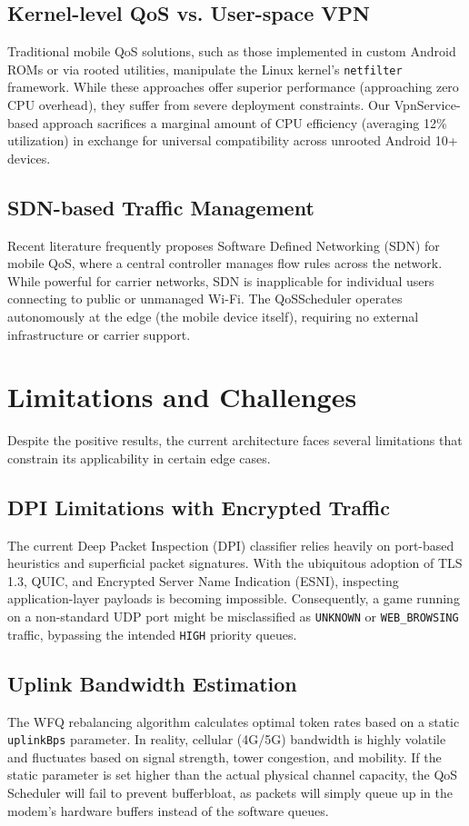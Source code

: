 \subsection{Kernel-level QoS vs. User-space VPN}
Traditional mobile QoS solutions, such as those implemented in custom Android ROMs or via rooted utilities, manipulate the Linux kernel's \texttt{netfilter} framework. While these approaches offer superior performance (approaching zero CPU overhead), they suffer from severe deployment constraints. Our VpnService-based approach sacrifices a marginal amount of CPU efficiency (averaging 12\% utilization) in exchange for universal compatibility across unrooted Android 10+ devices.

\subsection{SDN-based Traffic Management}
Recent literature frequently proposes Software Defined Networking (SDN) for mobile QoS, where a central controller manages flow rules across the network. While powerful for carrier networks, SDN is inapplicable for individual users connecting to public or unmanaged Wi-Fi. The QoSScheduler operates autonomously at the edge (the mobile device itself), requiring no external infrastructure or carrier support.

\section{Limitations and Challenges}
\label{sec:limitations}

Despite the positive results, the current architecture faces several limitations that constrain its applicability in certain edge cases.

\subsection{DPI Limitations with Encrypted Traffic}
The current Deep Packet Inspection (DPI) classifier relies heavily on port-based heuristics and superficial packet signatures. With the ubiquitous adoption of TLS 1.3, QUIC, and Encrypted Server Name Indication (ESNI), inspecting application-layer payloads is becoming impossible. Consequently, a game running on a non-standard UDP port might be misclassified as \texttt{UNKNOWN} or \texttt{WEB\_BROWSING} traffic, bypassing the intended \texttt{HIGH} priority queues.

\subsection{Uplink Bandwidth Estimation}
The WFQ rebalancing algorithm calculates optimal token rates based on a static \texttt{uplinkBps} parameter. In reality, cellular (4G/5G) bandwidth is highly volatile and fluctuates based on signal strength, tower congestion, and mobility. If the static parameter is set higher than the actual physical channel capacity, the QoS Scheduler will fail to prevent bufferbloat, as packets will simply queue up in the modem's hardware buffers instead of the software queues.

